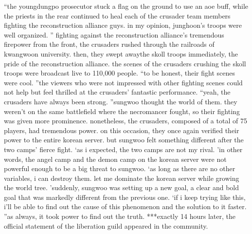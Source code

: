 “the youngdungpo prosecutor stuck a flag on the ground to use an aoe buff, while the priests in the rear continued to heal each of the crusader team members fighting the reconstruction alliance guys.
 in my opinion, junghoon’s troops were well organized.
”
fighting against the reconstruction alliance’s tremendous firepower from the front, the crusaders rushed through the railroads of kwangwoon university.
 then, they swept awaythe skoll troops immediately, the pride of the reconstruction alliance.
 the scenes of the crusaders crushing the skoll troops were broadcast live to 110,000 people.
“to be honest, their fight scenes were cool.
”the viewers who were not impressed with other fighting scenes could not help but feel thrilled at the crusaders’ fantastic performance.
“yeah, the crusaders have always been strong.
”sungwoo thought the world of them.
 they weren’t on the same battlefield where the necromancer fought, so their fighting was given more prominence.
 nonetheless, the crusaders, composed of a total of 75 players, had tremendous power.
on this occasion, they once again verified their power to the entire korean server.
but sungwoo felt something different after the two camps’ fierce fight.
‘as i expected, the two camps are not my rival.
’in other words, the angel camp and the demon camp on the korean server were not powerful enough to be a big threat to sungwoo.
‘as long as there are no other variables, i can destroy them.
 let me dominate the korean server while growing the world tree.
’suddenly, sungwoo was setting up a new goal, a clear and bold goal that was markedly different from the previous one.
‘if i keep trying like this, i’ll be able to find out the cause of this phenomenon and the solution to it faster.
”as always, it took power to find out the truth.
***exactly 14 hours later, the official statement of the liberation guild appeared in the community.

